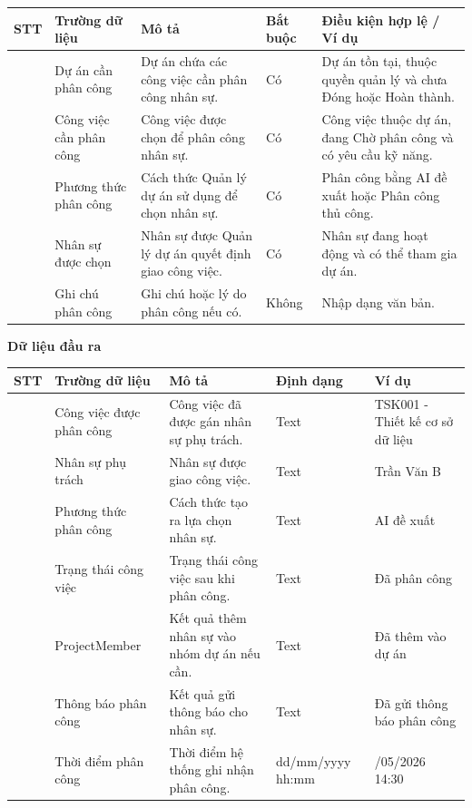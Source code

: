 \documentclass[../DoAn.tex]{subfiles}
\begin{document}
{\ucDataText
\begin{longtable}{|>{\centering\arraybackslash}p{}|>{\raggedright\arraybackslash}p{}|>{\raggedright\arraybackslash}p{}|>{\raggedright\arraybackslash}p{}|>{\raggedright\arraybackslash}p{}|}
\hline
\rowcolor{ucHeaderBg}\textbf{STT} & \textbf{Trường dữ liệu} & \textbf{Mô tả} & \textbf{Bắt buộc} & \textbf{Điều kiện hợp lệ / Ví dụ} \\ \hline
1 & Dự án cần phân công & Dự án chứa các công việc cần phân công nhân sự. & Có & Dự án tồn tại, thuộc quyền quản lý và chưa Đóng hoặc Hoàn thành. \\ \hline
2 & Công việc cần phân công & Công việc được chọn để phân công nhân sự. & Có & Công việc thuộc dự án, đang Chờ phân công và có yêu cầu kỹ năng. \\ \hline
3 & Phương thức phân công & Cách thức Quản lý dự án sử dụng để chọn nhân sự. & Có & Phân công bằng AI đề xuất hoặc Phân công thủ công. \\ \hline
4 & Nhân sự được chọn & Nhân sự được Quản lý dự án quyết định giao công việc. & Có & Nhân sự đang hoạt động và có thể tham gia dự án. \\ \hline
5 & Ghi chú phân công & Ghi chú hoặc lý do phân công nếu có. & Không & Nhập dạng văn bản. \\ \hline
\end{longtable}
}

\textbf{Dữ liệu đầu ra}

{\ucDataText
\begin{longtable}{|>{\centering\arraybackslash}p{}|>{\raggedright\arraybackslash}p{}|>{\raggedright\arraybackslash}p{}|>{\raggedright\arraybackslash}p{}|>{\raggedright\arraybackslash}p{}|}
\hline
\rowcolor{ucHeaderBg}\textbf{STT} & \textbf{Trường dữ liệu} & \textbf{Mô tả} & \textbf{Định dạng} & \textbf{Ví dụ} \\ \hline
1 & Công việc được phân công & Công việc đã được gán nhân sự phụ trách. & Text & TSK001 - Thiết kế cơ sở dữ liệu \\ \hline
2 & Nhân sự phụ trách & Nhân sự được giao công việc. & Text & Trần Văn B \\ \hline
3 & Phương thức phân công & Cách thức tạo ra lựa chọn nhân sự. & Text & AI đề xuất \\ \hline
4 & Trạng thái công việc & Trạng thái công việc sau khi phân công. & Text & Đã phân công \\ \hline
5 & ProjectMember & Kết quả thêm nhân sự vào nhóm dự án nếu cần. & Text & Đã thêm vào dự án \\ \hline
6 & Thông báo phân công & Kết quả gửi thông báo cho nhân sự. & Text & Đã gửi thông báo phân công \\ \hline
7 & Thời điểm phân công & Thời điểm hệ thống ghi nhận phân công. & dd/mm/yyyy hh:mm & 21/05/2026 14:30 \\ \hline
\end{longtable}
}
\end{document}
